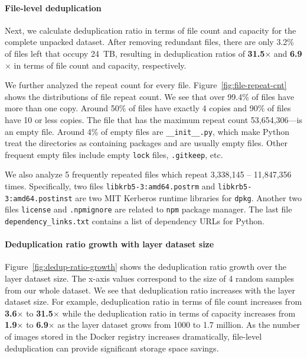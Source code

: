 \paragraph{File-level deduplication}
%
Next, we calculate deduplication ratio in terms of file count and capacity for
the complete unpacked dataset.
%
After removing redundant files, there are only 3.2\% of files left that occupy
24~TB, resulting in deduplication ratios of \textbf{31.5$\times$} and
\textbf{6.9$\times$} in terms of file count and capacity, respectively.
%

%
We further analyzed the repeat count for every file.
%
Figure~\ref{fig:file-repeat-cnt} shows the distributions of file repeat count.  
%
We see that over 99.4\% of files have more than one copy.
%
Around 50\% of files have exactly 4 copies and 90\% of files have 10 or less
copies. 
%
The file that has the maximum repeat count 53,654,306---is an empty file.
%
Around 4\% of empty files are \texttt{\_\_init\_\_.py}, which make Python treat the 
directories as containing packages and are usually empty files. 
Other frequent empty files include empty \texttt{lock} files, \texttt{.gitkeep}, etc.

We also analyze 5 frequently repeated files which repeat 3,338,145 -- 11,847,356 times.
Specifically, two files 
\texttt{libkrb5-3:amd64.postrm} and \texttt{libkrb5-3:amd64.postinst}
are two MIT Kerberos runtime libraries for \texttt{dpkg}.
Another two files \texttt{license} and \texttt{.npmignore} are related to \texttt{npm} package manager.
The last file \texttt{dependency\_links.txt} contains a list of dependency URLs for Python.

\paragraph{Deduplication ratio growth with layer dataset size}

Figure~\ref{fig:dedup-ratio-growth} shows the deduplication ratio growth over the layer dataset size. The x-axis values correspond to the size of 4 random samples from our whole dataset. We see that deduplication ratio increases with the layer dataset size.
%
For example, deduplication ratio
in terms of file count increases from \textbf{3.6$\times$} to \textbf{31.5$\times$} while the deduplication ratio in terms of capacity increases from \textbf{1.9$\times$} to \textbf{6.9$\times$}  
as the layer dataset grows from 1000 to 1.7 million.
% 
As the number of images stored in the Docker registry increases dramatically,
file-level deduplication can provide significant storage space savings.
